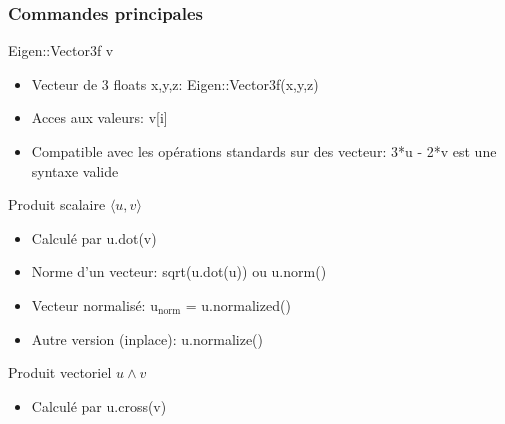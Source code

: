 \documentclass{beamer}
\begin{document}
\begin{frame}
\frametitle{Commandes principales}
\begin{block}{Eigen::Vector3f v}
\begin{itemize}
\item Vecteur de $3$ floats x,y,z: Eigen::Vector3f(x,y,z)
\item Acces aux valeurs: v[i]
\item Compatible avec les opérations standards sur des vecteur: 3*u - 2*v est une syntaxe valide
\end{itemize}
\end{block}


\begin{block}{Produit scalaire $\langle u , v \rangle$}
\begin{itemize}
\item Calculé par u.dot(v)
\item Norme d'un vecteur: sqrt(u.dot(u)) ou u.norm()
\item Vecteur normalisé: $\textrm{u}_{\textrm{norm}}$ = u.normalized()
\item Autre version (inplace): u.normalize()
\end{itemize}
\end{block}

\begin{block}{Produit vectoriel $u \wedge v$}
\begin{itemize}
\item Calculé par u.cross(v)
\end{itemize}
\end{block}

\end{frame}


\end{document}
